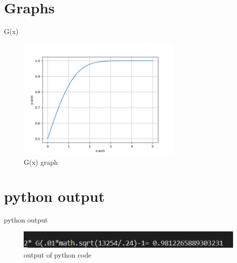 \documentclass{beamer}
\begin{document}
\section{Graphs}
\begin{frame}{G(x)}
\begin{figure}[htb!]
    \centering
    \includegraphics[width=8cm]{figures/fig1.png}
    \caption{G(x) graph}
    \label{fig:my_label}
\end{figure}
    
\end{frame}
\section{python output}
\begin{frame}{python output}
\begin{figure}[htb!]
    \centering
    \includegraphics[width=12cm]{figures/python_output.png}
    \caption{output of python code}
    \label{fig:my_label}
\end{figure}
    
\end{frame}
\end{document}
